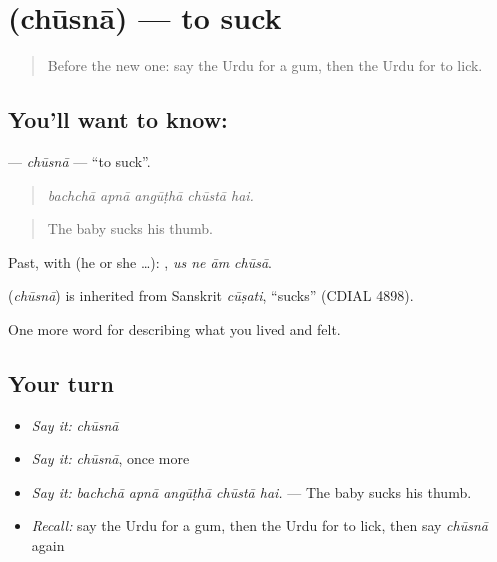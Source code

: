 \section[\texorpdfstring{\ur{چوسنا} (chūsnā)}{چوسنا (chūsnā)}]{ (chūsnā) — to suck}

\label{lesson:UR-C467-chusna}



\begin{quote}
Before the new one: say the Urdu for a gum, then the Urdu for to lick.
\end{quote}

\subsection*{You'll want to know: }
\textbf{} — \emph{chūsnā} — \textquotedblleft{}to suck\textquotedblright{}.

\begin{quote}
    
\end{quote}

\begin{quote}
\emph{bachchā apnā angūṭhā chūstā hai.}
\end{quote}

\begin{quote}
The baby sucks his thumb.
\end{quote}

Past, with  (he or she …):    , \emph{us ne ām chūsā}.

\begin{cousinweb}
\textbf{} (\emph{chūsnā}) is inherited from Sanskrit \emph{cūṣati}, \textquotedblleft{}sucks\textquotedblright{} (CDIAL 4898).
\end{cousinweb}

\begin{grammarlens}[title={What you've built}]
One more word for describing what you lived and felt.
\end{grammarlens}

\subsection*{Your turn}
\begin{itemize}
\raggedright
  \item \emph{Say it:} \emph{chūsnā}
  \item \emph{Say it:} \emph{chūsnā}, once more
  \item \emph{Say it:} \emph{bachchā apnā angūṭhā chūstā hai.} — The baby sucks his thumb.
  \item \emph{Recall:} say the Urdu for a gum, then the Urdu for to lick, then say \emph{chūsnā} again
\end{itemize}


